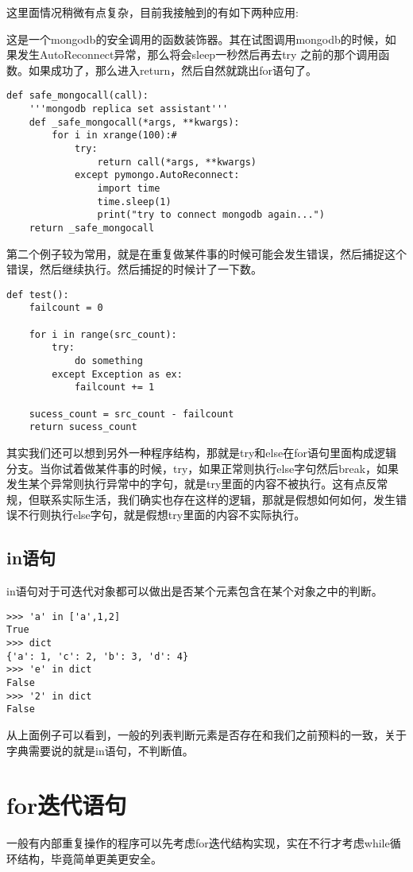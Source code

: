 \documentclass[12pt,oneside]{book}
\begin{document}
\begin{common-format}
这里面情况稍微有点复杂，目前我接触到的有如下两种应用:

这是一个mongodb的安全调用的函数装饰器。其在试图调用mongodb的时候，如果发生AutoReconnect异常，那么将会sleep一秒然后再去try 之前的那个调用函数。如果成功了，那么进入return，然后自然就跳出for语句了。
\begin{Verbatim}
def safe_mongocall(call):
    '''mongodb replica set assistant'''
    def _safe_mongocall(*args, **kwargs):
        for i in xrange(100):#
            try:
                return call(*args, **kwargs)
            except pymongo.AutoReconnect:
                import time
                time.sleep(1)
                print("try to connect mongodb again...")
    return _safe_mongocall
\end{Verbatim}


第二个例子较为常用，就是在重复做某件事的时候可能会发生错误，然后捕捉这个错误，然后继续执行。然后捕捉的时候计了一下数。
\begin{Verbatim}
def test():
    failcount = 0

    for i in range(src_count):
        try:
            do something
        except Exception as ex:
            failcount += 1

    sucess_count = src_count - failcount
    return sucess_count
\end{Verbatim}

其实我们还可以想到另外一种程序结构，那就是try和else在for语句里面构成逻辑分支。当你试着做某件事的时候，try，如果正常则执行else字句然后break，如果发生某个异常则执行异常中的字句，就是try里面的内容不被执行。这有点反常规，但联系实际生活，我们确实也存在这样的逻辑，那就是假想如何如何，发生错误不行则执行else字句，就是假想try里面的内容不实际执行。


\subsection{in语句}
in语句对于可迭代对象都可以做出是否某个元素包含在某个对象之中的判断。
\begin{Verbatim}
>>> 'a' in ['a',1,2]
True
>>> dict
{'a': 1, 'c': 2, 'b': 3, 'd': 4}
>>> 'e' in dict
False
>>> '2' in dict
False
\end{Verbatim}
从上面例子可以看到，一般的列表判断元素是否存在和我们之前预料的一致，关于字典需要说的就是in语句，不判断值。


\section{for迭代语句}
一般有内部重复操作的程序可以先考虑for迭代结构实现，实在不行才考虑while循环结构，毕竟简单更美更安全。


\end{common-format}
\end{document}
